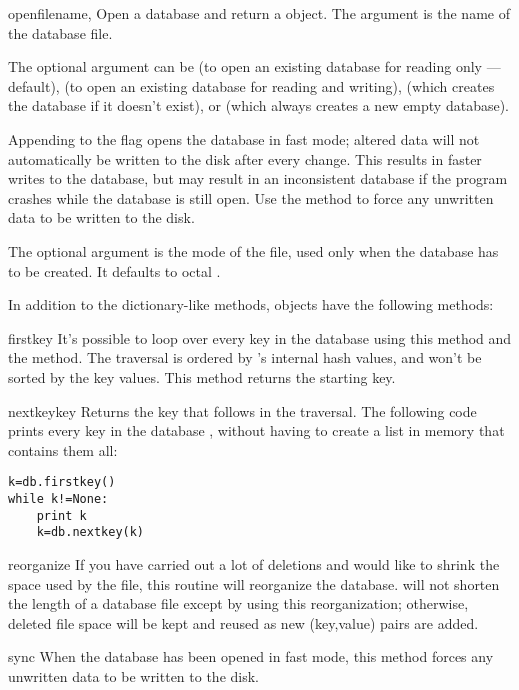 \begin{funcdesc}{open}{filename, }
Open a  database and return a  object.  The
 argument is the name of the database file.

The optional  argument can be
 (to open an existing database for reading only --- default),
 (to open an existing database for reading and writing),
 (which creates the database if it doesn't exist), or
 (which always creates a new empty database).

Appending  to the flag opens the database in fast mode;
altered data will not automatically be written to the disk after every
change.  This results in faster writes to the database, but may result
in an inconsistent database if the program crashes while the database
is still open.  Use the  method to force any unwritten
data to be written to the disk.

The optional  argument is the \UNIX{} mode of the file, used
only when the database has to be created.  It defaults to octal
.
\end{funcdesc}

In addition to the dictionary-like methods,  objects have the
following methods:

\begin{funcdesc}{firstkey}{}
It's possible to loop over every key in the database using this method
and the  method.  The traversal is ordered by 's
internal hash values, and won't be sorted by the key values.  This
method returns the starting key.
\end{funcdesc}

\begin{funcdesc}{nextkey}{key}
Returns the key that follows  in the traversal.  The
following code prints every key in the database , without having to
create a list in memory that contains them all:
\begin{verbatim}
k=db.firstkey()
while k!=None:
    print k
    k=db.nextkey(k)
\end{verbatim}
\end{funcdesc}

\begin{funcdesc}{reorganize}{}
If you have carried out a lot of deletions and would like to shrink
the space used by the  file, this routine will reorganize the
database.   will not shorten the length of a database file except
by using this reorganization; otherwise, deleted file space will be
kept and reused as new (key,value) pairs are added.
\end{funcdesc}

\begin{funcdesc}{sync}{}
When the database has been opened in fast mode, this method forces any
unwritten data to be written to the disk.
\end{funcdesc}

